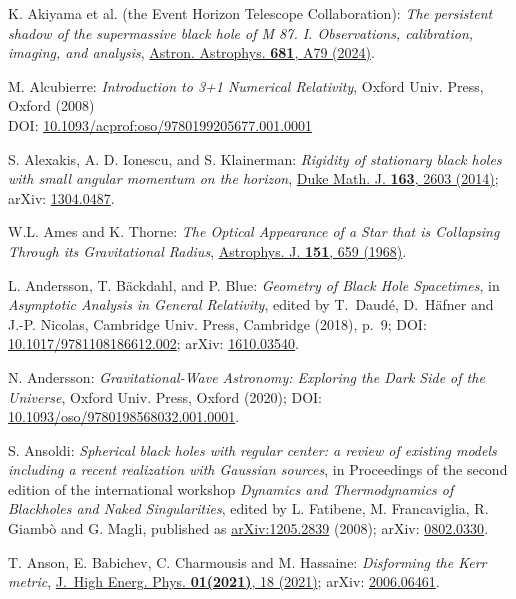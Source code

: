 \begin{thebibliography}{123}
K. Akiyama et al. (the Event Horizon Telescope Collaboration):
{\em The persistent shadow of the supermassive black hole of M 87.
I. Observations, calibration, imaging, and analysis},
\href{https://doi.org/10.1051/0004-6361/202347932}{Astron. Astrophys. {\bf 681}, A79 (2024)}.

M. Alcubierre:
{\em Introduction to 3+1 Numerical Relativity},
Oxford Univ. Press, Oxford (2008)\\
DOI: \href{https://doi.org/10.1093/acprof:oso/9780199205677.001.0001}{10.1093/acprof:oso/9780199205677.001.0001}

S. Alexakis, A. D. Ionescu, and S. Klainerman: {\em Rigidity of stationary black holes with small angular momentum on the horizon},
\href{https://doi.org/10.1215/00127094-2819517}{Duke Math. J. {\bf 163}, 2603 (2014)};
arXiv: \href{https://arxiv.org/abs/1304.0487}{1304.0487}.

W.L. Ames and K. Thorne:
{\em The Optical Appearance of a Star that is Collapsing Through its Gravitational Radius},
\href{https://doi.org/10.1086/149465}{Astrophys. J. {\bf 151}, 659 (1968)}.

L. Andersson, T. Bäckdahl, and P. Blue:
{\em Geometry of Black Hole Spacetimes},
in {\em Asymptotic Analysis in General Relativity}, edited by
T.~Daudé, D.~Häfner and J.-P. Nicolas,
Cambridge Univ. Press, Cambridge (2018), p.~9;
DOI: \href{https://doi.org/10.1017/9781108186612.002}{10.1017/9781108186612.002};
arXiv: \href{https://arxiv.org/abs/1610.03540}{1610.03540}.

N. Andersson:
{\em Gravitational-Wave Astronomy: Exploring the Dark Side of the Universe},
Oxford Univ. Press, Oxford (2020);
DOI: \href{https://doi.org/10.1093/oso/9780198568032.001.0001}{10.1093/oso/9780198568032.001.0001}.

S. Ansoldi:
{\em Spherical black holes with regular center: a review of existing models including a recent realization with Gaussian sources},
in Proceedings of the second edition of the international workshop \emph{Dynamics and Thermodynamics of Blackholes and Naked Singularities}, edited by L. Fatibene, M. Francaviglia, R. Giambò and G. Magli,
published as \href{https://arxiv.org/abs/1205.2839}{arXiv:1205.2839}
(2008);
arXiv: \href{https://arxiv.org/abs/0802.0330}{0802.0330}.

T. Anson, E. Babichev, C. Charmousis and M. Hassaine:
{\em Disforming the Kerr metric},
\href{https://doi.org/10.1007/JHEP01(2021)018}{J.~High Energ. Phys. {\bf 01(2021)}, 18 (2021)};
arXiv: \href{https://arxiv.org/abs/2006.06461}{2006.06461}.


\end{thebibliography}
